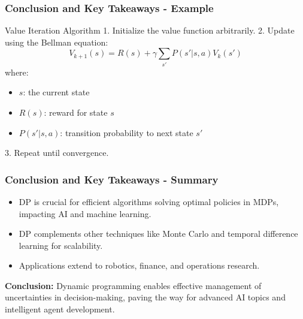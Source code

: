 \documentclass[aspectratio=169]{beamer}
\begin{document}
\begin{frame}[fragile]
    \frametitle{Conclusion and Key Takeaways - Example}
    \begin{block}{Value Iteration Algorithm}
        1. Initialize the value function arbitrarily.
        2. Update using the Bellman equation:
        \begin{equation}
        V_{k+1}(s) = R(s) + \gamma \sum_{s'} P(s' | s, a)V_k(s')
        \end{equation}
        where:
        \begin{itemize}
            \item $s$: the current state
            \item $R(s)$: reward for state $s$
            \item $P(s' | s, a)$: transition probability to next state $s'$
        \end{itemize}
        3. Repeat until convergence.
    \end{block}
\end{frame}

\begin{frame}[fragile]
    \frametitle{Conclusion and Key Takeaways - Summary}
    \begin{itemize}
        \item DP is crucial for efficient algorithms solving optimal policies in MDPs, impacting AI and machine learning.
        \item DP complements other techniques like Monte Carlo and temporal difference learning for scalability.
        \item Applications extend to robotics, finance, and operations research.
    \end{itemize}
    
    \textbf{Conclusion:} Dynamic programming enables effective management of uncertainties in decision-making, paving the way for advanced AI topics and intelligent agent development.
\end{frame}
\end{document}

